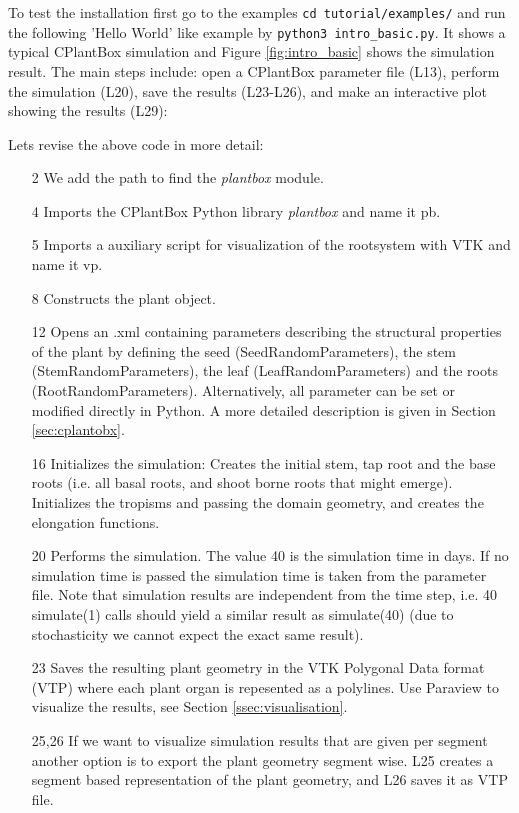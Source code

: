 To test the installation first go to the examples \lstinline{cd tutorial/examples/} and run the following 'Hello World' like example by \lstinline{python3 intro_basic.py}. It shows a typical CPlantBox simulation and Figure \ref{fig:intro_basic} shows the simulation result. The main steps include: open a CPlantBox parameter file (L13), perform the simulation (L20), save the results (L23-L26), and make an interactive plot showing the results (L29):  

 

\noindent 
Lets revise the above code in more detail: 
\begin{itemize}
 \item[2] We add the path to find the \emph{plantbox} module.
 \item[4] Imports the CPlantBox Python library \emph{plantbox} and name it pb.
 \item[5] Imports a auxiliary script for visualization of the rootsystem with VTK and name it vp.
 \item[8] Constructs the plant object.
 \item[12] Opens an .xml containing parameters describing the structural properties of the plant by defining the seed (SeedRandomParameters), the stem (StemRandomParameters), the leaf (LeafRandomParameters) and the roots (RootRandomParameters). Alternatively, all parameter can be set or modified directly in Python. A more detailed description is given in Section \ref{sec:cplantobx}.
 \item[16] Initializes the simulation: Creates the initial stem, tap root and the base roots
 (i.e. all basal roots, and shoot borne roots that might emerge). Initializes the tropisms and passing the domain geometry, 
 and creates the elongation functions. 
 \item[20] Performs the simulation. The value 40 is the simulation time in days. If no simulation time is passed the simulation time is taken from the parameter file. Note that simulation results are independent from the time step, i.e. 40 simulate(1) calls should yield a similar result 
 as simulate(40) (due to stochasticity we cannot expect the exact same result). 
 \item[23] Saves the resulting plant geometry in the VTK Polygonal Data format (VTP) where each plant organ is repesented as a polylines. Use Paraview to visualize the results, see Section \ref{ssec:visualisation}.
 \item[25,26] If we want to visualize simulation results that are given per segment another option is to export the plant geometry segment wise. L25 creates a segment based representation of the plant geometry, and L26 saves it as VTP file.

\end{itemize}
